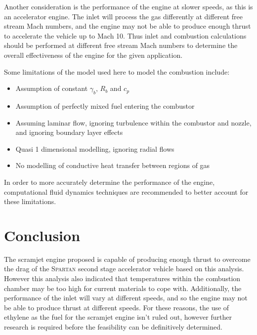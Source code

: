 \documentclass[a4paper]{article}
\begin{document}
Another consideration is the performance of the engine at slower speeds, as this is an accelerator engine. The inlet will process the gas differently at different free stream Mach numbers, and the engine may not be able to produce enough thrust to accelerate the vehicle up to Mach 10. Thus inlet and combustion calculations should be performed at different free stream Mach numbers to determine the overall effectiveness of the engine for the given application. 

Some limitations of the model used here to model the combustion include:

\begin{itemize}
    \item Assumption of constant \(\gamma_b\), \(R_b\) and \(c_p\)
    \item Assumption of perfectly mixed fuel entering the combustor
    \item Assuming laminar flow, ignoring turbulence within the combustor and nozzle, and ignoring boundary layer effects
    \item Quasi 1 dimensional modelling, ignoring radial flows
    \item No modelling of conductive heat transfer between regions of gas
\end{itemize}

In order to more accurately determine the performance of the engine, computational fluid dynamics techniques are recommended to better account for these limitations.

\section{Conclusion}
The scramjet engine proposed is capable of producing enough thrust to overcome the drag of the \textsc{Spartan} second stage accelerator vehicle based on this analysis. However this analysis also indicated that temperatures within the combustion chamber may be too high for current materials to cope with. Additionally, the performance of the inlet will vary at different speeds, and so the engine may not be able to produce thrust at different speeds. For these reasons, the use of ethylene as the fuel for the scramjet engine isn't ruled out, however further research is required before the feasibility can be definitively determined.

\newpage
\appendix
\end{document}
